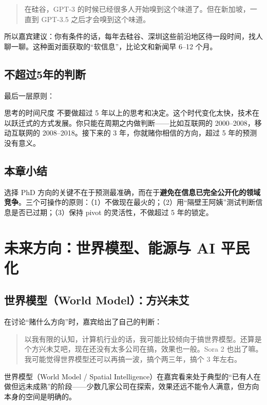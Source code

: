 \documentclass[a4paper]{article}
\begin{document}
\begin{quote}
在硅谷，GPT-3 的时候已经很多人开始嗅到这个味道了。但在新加坡，一直到 GPT-3.5 之后才会嗅到这个味道。
\end{quote}

所以嘉宾建议：你有条件的话，每年去硅谷、深圳这些前沿地区待一段时间，找人聊一聊。这种面对面获取的``软信息''，比论文和新闻早 6--12 个月。

\subsection{不超过5年的判断}

最后一层原则：

\begin{importantbox}{思考的时间尺度}
不要做超过 5 年以上的思考和决定。这个时代变化太快，技术在以跃迁式的方式发展。你只能在周期之内做判断——比如互联网的 2000--2008，移动互联网的 2008--2018。接下来的 3 年，你就赌你相信的方向，超过 5 年的预测没有意义。
\end{importantbox}

\subsection{本章小结}

选择 PhD 方向的关键不在于预测最准确，而在于\textbf{避免在信息已完全公开化的领域竞争}。三个可操作的原则：（1）不做现在最火的；（2）用``隔壁王阿姨''测试判断信息是否已过期；（3）保持 pivot 的灵活性，不做超过 5 年的锁定。


\section{未来方向：世界模型、能源与 AI 平民化}

\subsection{世界模型（World Model）：方兴未艾}

在讨论``赌什么方向''时，嘉宾给出了自己的判断：

\begin{quote}
以我有限的认知，计算机行业的话，我可能比较倾向于搞世界模型。还算是个方兴未艾吧，现在还没有太多公司在搞，效果也一般。Sora 2 也出了嘛。我可能觉得世界模型还可以再搞一波，搞个两三年，搞个 3 年左右。
\end{quote}

世界模型（World Model / Spatial Intelligence）在嘉宾看来处于典型的``已有人在做但远未成熟''的阶段——少数几家公司在探索，效果还远不能令人满意，但方向本身的空间是明确的。
\end{document}
